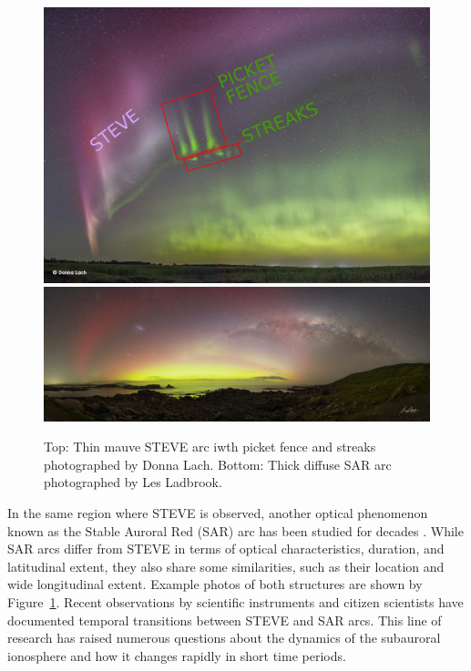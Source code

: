 \documentclass{article}
\renewcommand{\cite}[1]{\parencite{#1}}
\begin{document}
\begin{figure}[h!]
  \includegraphics[width=\linewidth]{Fig6a_STEVE-DonnaLach.png}
\includegraphics[width=\linewidth]{Fig6b_SAR-LesLadbrook.jpg}
  \caption{Top: Thin mauve STEVE arc iwth picket fence and streaks photographed by Donna Lach. Bottom: Thick diffuse SAR arc photographed by Les Ladbrook.}
  \label{STEVESARExample}
\end{figure}
In the same region where STEVE is observed, another optical phenomenon known as the Stable Auroral Red (SAR) arc has been studied for decades \cite{Kozyra1997, Mendillo_2016a, Martinis2022}. While SAR arcs differ from STEVE in terms of optical characteristics, duration, and latitudinal extent, they also share some similarities, such as their location and wide longitudinal extent. Example photos of both structures are shown by Figure~\ref{STEVESARExample}. Recent observations by scientific instruments and citizen scientists have documented temporal transitions between STEVE and SAR arcs. This line of research has raised numerous questions about the dynamics of the subauroral ionosphere and how it changes rapidly in short time periods.\\
\end{document}
